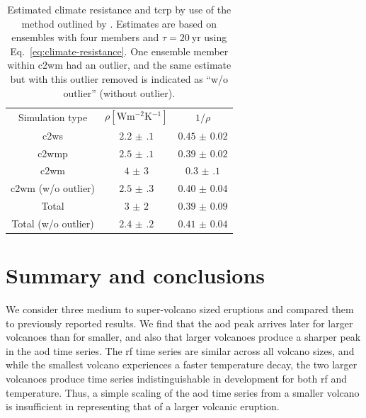 \documentclass{ametsocV6.1}
\begin{document}
\begin{table}
  \centering

  \caption{Estimated climate resistance and \gls{tcrp} by use of the method outlined by
    \citet{merlis2014}. Estimates are based on ensembles with four members and \(\tau
    =\SI{20}{\mathrm{yr}}\) using Eq.~\ref{eq:climate-resistance}. One ensemble member
    within \gls{c2wm} had an outlier, and the same estimate but with this outlier removed is
    indicated as ``w/o outlier'' (without outlier).}\label{tab:trcp}%
  \begin{tabular}{ccc}
    Simulation type          & \(\rho [\si{\watt\metre^{-2}\kelvin^{-1}}]\) & \(1/\rho\)        \\
    \gls{c2ws}               & \(\num{2.2(1)}\)                             & \(\num{0.45(2)}\) \\
    \gls{c2wmp}              & \(\num{2.5(1)}\)                             & \(\num{0.39(2)}\) \\
    \gls{c2wm}               & \(\num{4(3)}\)                               & \(\num{0.3(1)}\)  \\
    \gls{c2wm} (w/o outlier) & \(\num{2.5(3)}\)                             & \(\num{0.40(4)}\) \\
    Total                    & \(\num{3(2)}\)                               & \(\num{0.39(9)}\) \\
    Total (w/o outlier)      & \(\num{2.4(2)}\)                             & \(\num{0.41(4)}\) \\
  \end{tabular}
\end{table}


\section{Summary and conclusions}\label{sec:conclusions}

We consider three medium to super-volcano sized eruptions and compared them to
previously reported results. We find that the \gls{aod} peak arrives later for larger volcanoes than for smaller, and also that larger volcanoes
produce a sharper peak in the \gls{aod} time series. The \gls{rf} time series are
similar across all volcano sizes, and while the smallest volcano experiences a faster
temperature decay, the two larger volcanoes produce time series indistinguishable in
development for both \gls{rf} and temperature. Thus, a simple scaling of the \gls{aod}
time series from a smaller volcano is insufficient in representing that of a larger
volcanic eruption.
\end{document}
